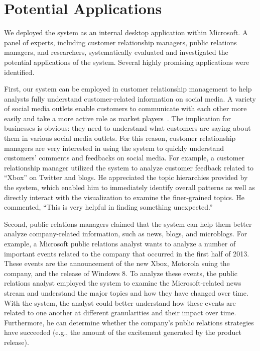 
\section{Potential Applications}\label{sec:application}

We deployed the system as an internal desktop application within Microsoft. A panel of experts, including customer relationship managers, public relations managers, and researchers, systematically evaluated and investigated the potential applications of the system.  Several highly promising applications were identified.



First, our system can be employed in customer relationship management to help analysts fully understand customer-related information on social media.
A variety of social media outlets enable customers to communicate with each other more easily and take a more active role as market players~\cite{Hennig2010}.
The implication for businesses is obvious: they need to understand what customers are saying about them in various social media outlets.
For this reason, customer relationship managers are very interested in using the system to quickly understand customers' comments and feedbacks on social media.
For example, a customer relationship manager utilized the system to analyze customer feedback related to ``Xbox'' on Twitter and blogs.
He appreciated the topic hierarchies provided by the system, which enabled him to immediately identify overall patterns as well as directly interact with the visualization to examine the finer-grained topics.
He commented, ``This is very helpful in finding something unexpected.''

Second, public relations managers claimed that the system can help them better analyze company-related information, such as news, blogs, and microblogs.
For example, a Microsoft public relations analyst wants to analyze a number of important events related to the company that occurred in the first half of 2013.
These events are the announcement of the new Xbox, Motorola suing the company, and the release of Windows 8.
To analyze these events, the public relations analyst employed the system to examine the Microsoft-related news stream and understand the major topics and how they have changed over time.
With the system, the analyst could better understand how these events are related to one another at different granularities and their impact over time.
Furthermore, he can determine whether the company's public relations strategies have succeeded (e.g., the amount of the excitement generated by the product release).

